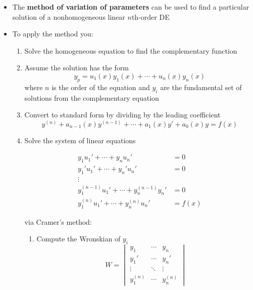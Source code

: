 \documentclass{article}
\begin{document}
\begin{itemize}
  \item The \textbf{method of variation of parameters} can be used to find a particular solution of a nonhomogeneous linear $n$th-order DE

  \item To apply the method you:

        \begin{enumerate}
          \item Solve the homogeneous equation to find the complementary function

          \item Assume the solution has the form \[y_p = u_1(x) y_1(x) + \cdots + u_n(x) y_n(x)\] where $n$ is the order of the equation and $y_i$ are the fundamental set of solutions from the complementary equation

          \item Convert to standard form by dividing by the leading coefficient \[y^{(n)} + a_{n - 1}(x) y^{(n - 1)} + \cdots + a_1(x) y' + a_0(x) y = f(x)\]

          \item Solve the system of linear equations

                \begin{align*}
                  y_1 u_1' + \cdots + y_n u_n'                     & = 0    \\
                  y_1' u_1' + \cdots + y_n' u_n'                   & = 0    \\
                  \vdots \qquad \qquad                                      \\
                  y_1^{(n - 1)} u_1' + \cdots + y_n^{(n - 1)} y_n' & = 0    \\
                  y_1^{(n)} u_1' + \cdots + y_n^{(n)} u_n'         & = f(x)
                \end{align*}

                via Cramer's method:

                \begin{enumerate}
                  \item Compute the Wronskian of $y_i$ \[W = \begin{vmatrix}
                            y_1       & \cdots & y_n       \\
                            y_1'      & \cdots & y_n'      \\
                            \vdots    & \ddots & \vdots    \\
                            y_1^{(n)} & \cdots & y_n^{(n)}
                          \end{vmatrix}\]


\end{enumerate}
\end{enumerate}
\end{itemize}
\end{document}
